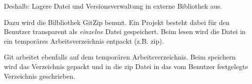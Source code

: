 Deshalb: Lagere Datei und Versionsverwaltung in externe Bibliothek aus.

Dazu wird die Bilbliothek GitZip benuzt.
Ein Projekt besteht dabei für den Benutzer transparent als \emph{einzelne} Datei gespeichert.
Beim lesen wird die Datei in ein temporäres Arbeitsverzeichnis entpackt (z.B. zip).

Git arbeitet ebenfalls auf dem temporären Arbeitsverzeichnis.
Beim speichern wird das Verzeichnis gepackt und in die zip Datei in das vom Benutzer festgelegte Verzeichnis geschrieben.

















